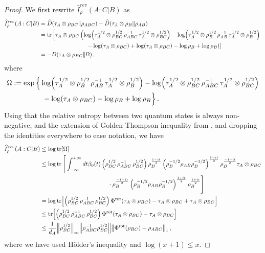 \documentclass[11pt]{article}
\theoremstyle{newdefinition}
\theoremstyle{newplain}
\theoremstyle{myplain}
\DeclareMathOperator{\1}{\mathds{1}}
\begin{document}
{\begin{proof}

We first rewrite $\widehat{I}^{rev}_{\rho}(A:C | B) $ as 
\begin{align}
    \widehat{I}^{rev}_{\rho}(A:C | B) & =  \widehat{D}(\tau_A \otimes \rho_{BC} \| \rho_{ABC}) - \widehat{D}(\tau_A \otimes \rho_{B} \| \rho_{AB}) \\
    & = \tr \left[ \tau_{A} \otimes \rho_{BC} \left( \log (\tau_A^{1/2} \otimes \rho_{BC}^{1/2} \, \rho_{ABC}^{-1} \, \tau_A^{1/2} \otimes \rho_{BC}^{1/2}  ) - \log (\tau_A^{1/2} \otimes \rho_{B}^{1/2} \, \rho_{AB}^{-1} \, \tau_A^{1/2} \otimes \rho_{B}^{1/2}  ) \right. \right. \\
    & \hspace{2.8cm} \left. \left. -\log (\tau_A \otimes \rho_{BC}) + \log (\tau_A \otimes \rho_{BC}) - \log \rho_B + \log \rho_B    \right) \right] \\
    & = - D( \tau_{A} \otimes \rho_{BC}  \| \Omega) \, ,
\end{align}
where 
\begin{align}
    \Omega& := \exp \Big\{  \log (\tau_A^{1/2} \otimes \rho_{B}^{1/2} \, \rho_{AB}^{-1} \, \tau_A^{1/2} \otimes \rho_{B}^{1/2}  ) - \log (\tau_A^{1/2} \otimes \rho_{BC}^{1/2} \, \rho_{ABC}^{-1} \, \tau_A^{1/2} \otimes \rho_{BC}^{1/2}  )  \\
    & \hspace{1.5cm} -\log (\tau_A \otimes \rho_{BC}) - \log \rho_B + \log \rho_B   \Big\} \, .
\end{align}
Using that the relative entropy between two quantum states is always non-negative, and the extension of Golden-Thompson inequality from \cite{Sutter2017b}, and dropping the identities everywhere to ease notation, we have
\begin{align}
    \widehat{I}^{rev}_{\rho}(A:C | B) & \leq \log \tr[ \Omega ] \\
    & \leq \log \tr \Bigg[  \int_{-\infty}^{+\infty} dt \beta_0(t)  \left( \rho_{BC}^{1/2} \, \rho_{ABC}^{-1} \, \rho_{BC}^{1/2}  \right) \rho_B^{\frac{1-it}{2}} \left(\rho_B^{-1/2}\rho_{AB}\rho_B^{-1/2}\right)^{\frac{1-it}{2}}  \rho_B^{\frac{-1+it}{2}} \tau_A \otimes \rho_{BC}  \\
    & \hspace{4cm} \cdot \rho_B^{\frac{-1-it}{2}} \left(\rho_B^{-1/2}\rho_{AB}\rho_B^{-1/2}\right)^{\frac{1+it}{2}}  \rho_B^{\frac{1+it}{2}}   \Bigg] \\
    & = \log \tr[ \left( \rho_{BC}^{1/2} \, \rho_{ABC}^{-1} \, \rho_{BC}^{1/2}  \right) \Phi^{\text{rot}} (\tau_A \otimes \rho_{BC}) - \tau_A \otimes \rho_{BC} + \tau_A \otimes \rho_{BC}] \\
    & \leq \tr[ \left( \rho_{BC}^{1/2} \, \rho_{ABC}^{-1} \, \rho_{BC}^{1/2}  \right) \Phi^{\text{rot}} (\tau_A \otimes \rho_{BC}) - \tau_A \otimes \rho_{BC}] \\
    & \leq \frac{1}{d_A} \norm{\rho_{BC}^{1/2}}_\infty \norm{\rho_{ABC}^{-1} \rho_{BC}^{1/2}} \norm{  \Phi^{\text{rot}} (\rho_{BC}) -\rho_{ABC}}_1 \, ,
\end{align}
where we have used Hölder's inequality and $\log(x+1)\leq x$. 
    

\end{proof}}
\end{document}
